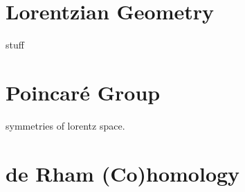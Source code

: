 \documentclass[UKenglish]{beamer}
\begin{document}
\section{Lorentzian Geometry}

\begin{frame}{}
    stuff
\end{frame}


\section{Poincar\'e Group}

\begin{frame}{}
symmetries of lorentz space.
\end{frame}

\section{de Rham (Co)homology}





%
%
\end{document}
